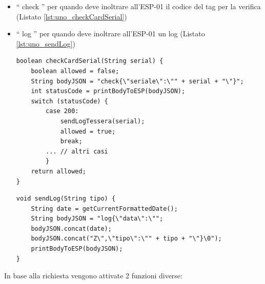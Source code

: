 \documentclass[12pt]{report}
\begin{document}
\begin{itemize}
	\item \textquotedblleft{} check \textquotedblright{} per quando deve inoltrare all'ESP-01 il codice del tag per la verifica (Listato \ref{lst:uno_checkCardSerial})
	\item \textquotedblleft{} log \textquotedblright{} per quando deve inoltrare all'ESP-01 un log (Listato \ref{lst:uno_sendLog})
	
\begin{lstlisting}[caption={L'Arduino manda all'ESP-01 il seriale della tessera in formato JSON e aspetta la risposta con lo status code. Se statusCode = 200 allora mette la variabile allowed a \textquotedblleft{} true \textquotedblright{}. La funzione printBodyToESP si può vedere nel Listato \ref{lst:uno_printBodyToESP} }, label={lst:uno_checkCardSerial}, xleftmargin=\dimexpr-\leftmargini]
boolean checkCardSerial(String serial) {
	boolean allowed = false;
	String bodyJSON = "check{\"seriale\":\"" + serial + "\"}";
	int statusCode = printBodyToESP(bodyJSON);
	switch (statusCode) {
		case 200:
			sendLogTessera(serial);
			allowed = true;
			break;
		... // altri casi
		}
	return allowed;
}
\end{lstlisting}

\pagebreak
	
\begin{lstlisting}[caption={L'Arduino manda all'ESP-01 il log in formato JSON e aspetta la risposta con lo status code. La funzione printBodyToESP si può vedere nel Listato \ref{lst:uno_printBodyToESP}.}, label={lst:uno_sendLog}, xleftmargin=\dimexpr-\leftmargini]
void sendLog(String tipo) {
	String date = getCurrentFormattedDate();
	String bodyJSON = "log{\"data\":\"";
	bodyJSON.concat(date);
	bodyJSON.concat("Z\",\"tipo\":\"" + tipo + "\"}\0");
	printBodyToESP(bodyJSON);
}
\end{lstlisting}

\end{itemize}
In base alla richiesta vengono attivate 2 funzioni diverse:
\end{document}

